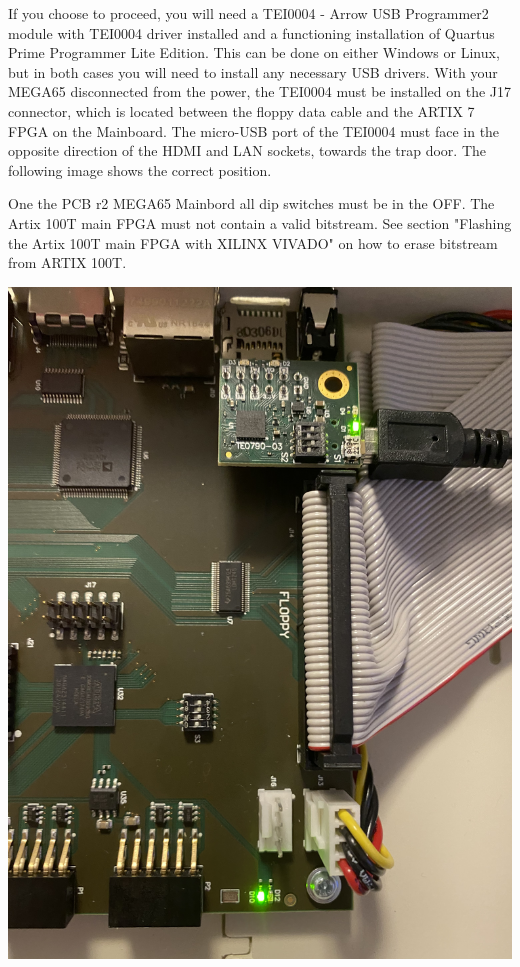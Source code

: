 If you choose to proceed, you will need a TEI0004 - Arrow USB Programmer2 module with TEI0004 driver installed
and a functioning installation of Quartus Prime Programmer Lite Edition.  This can be done on either Windows
or Linux, but in both cases you will need to install any necessary USB drivers.
With your MEGA65 disconnected from the power, the TEI0004 must be installed on the J17 connector,
which is located between the floppy data cable and the ARTIX 7 FPGA on the Mainboard.
The micro-USB port of the TEI0004 must face in the opposite direction of the HDMI and LAN sockets, towards
the trap door.
The following image shows the correct position.

One the PCB r2 MEGA65 Mainbord all dip switches must be in the OFF. The Artix 100T main FPGA must not contain
a valid bitstream. See section "Flashing the Artix 100T main FPGA with XILINX VIVADO" on how to erase bitstream
from ARTIX 100T.

\includegraphics[width=\linewidth]{images/jtag_detail_05.jpg}

